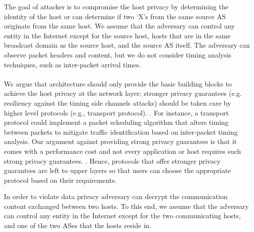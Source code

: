 The goal of attacker is to compromise the host privacy by determining the identity of the host or can determine if two ‘X’s from the same source AS originate from the same host. We assume that the adversary can  control any entity in the Internet except for the source host, hosts that are in the same broadcast domain as the source host, and the source AS itself. The adversary can observe packet headers and content, but we do not consider timing analysis techniques, such as inter-packet arrival times.
\\ \\
We argue that architecture should only provide the basic building blocks to achieve the host privacy at the network layer; stronger privacy guarantees (e.g. resiliency against the timing side channels attacks) should be taken care by higher level protocols (e.g., transport protocol). . For instance, a transport protocol could implement a packet scheduling algorithm that alters timing between packets to mitigate traffic identification based on inter-packet timing analysis. Our argument against providing strong privacy guarantees is that it comes with a performance cost and not every application or host requires such strong privacy guarantees. . Hence, protocols that offer stronger privacy guarantees are left to upper layers so that users can choose the appropriate protocol based on their requirements.

In order to violate data privacy adversary can decrypt the communication content exchanged between two hosts. To this end, we assume that the adversary can control any entity in the Internet except for the two communicating hosts, and one of the two ASes that the hosts reside in.